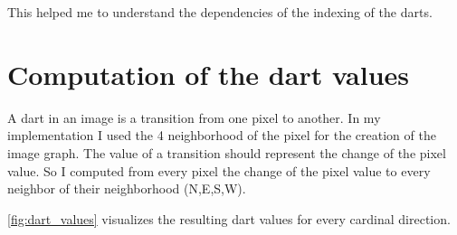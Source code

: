 \documentclass[12pt]{article}
\begin{document}

This helped me to understand the dependencies of the indexing of the darts.


\section{Computation of the dart values} %
\label{sec:computation_of_the_dart_values}

A dart in an image is a transition from one pixel to another. In my implementation I used the 4 neighborhood of the pixel for the creation of the image graph.
The value of a transition should represent the change of the pixel value.
So I computed from every pixel the change of the pixel value to every neighbor of their neighborhood (N,E,S,W).
\par
\cref{fig:dart_values} visualizes the resulting dart values for every cardinal direction.
\end{document}
